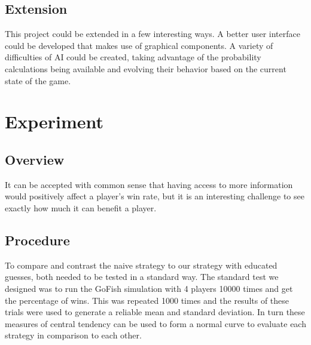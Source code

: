 \documentclass[preprint,12pt]{elsarticle}
\begin{document}
\subsection{Extension} 
This project could be extended in a few interesting ways. A better user interface could be developed that makes use of graphical components. A variety of difficulties of AI could be created, taking advantage of the probability calculations being available and evolving their behavior based on the current state of the game.

\section{Experiment}
\label{S:2}
\subsection{Overview}
It can be accepted with common sense that having access to more information would positively affect a player's win rate, but it is an interesting challenge to see exactly how much it can benefit a player.

\subsection{Procedure}
To compare and contrast the naive strategy to our strategy with educated guesses, both needed to be tested in a standard way. The standard test we designed was to run the GoFish simulation with 4 players 10000 times and get the percentage of wins. This was repeated 1000 times and the results of these trials were used to generate a reliable mean and standard deviation. In turn these measures of central tendency can be used to form a normal curve to evaluate each strategy in comparison to each other.
\end{document}

